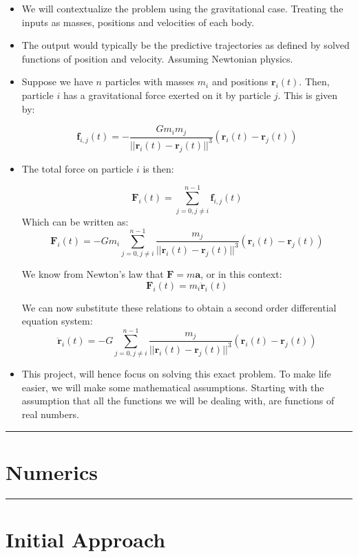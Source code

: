 \documentclass[11pt]{article}
\newcommand{\psection}[1]{{
    \begin{center}
        \noindent \rule{17cm}{0.4pt}
        \section*{\LARGE #1}
        \noindent \rule{17cm}{0.4pt}
    \end{center}
}}
\newcommand{\psubsection}[1]{{\section*{\LARGE #1}}}
\begin{document}
    \begin{itemize}
        \item We will contextualize the problem using the gravitational case. Treating the inputs as masses, positions and velocities of each body. \\

        \item The output would typically be the predictive trajectories as defined by solved functions of position and velocity. Assuming Newtonian physics. \\

        \item Suppose we have $n$ particles with masses $m_i$ and positions $\mathbf{r}_i(t)$. Then, particle $i$ has a gravitational force exerted on it by particle $j$. This is given by:

        \[ \mathbf{f}_{i,j}(t) = -\frac{Gm_i m_j}{|| \mathbf{r}_i(t) - \mathbf{r}_j(t) ||^3}(\mathbf{r}_i(t) - \mathbf{r}_j(t)) \]

        \item The total force on particle $i$ is then:

        \[ \mathbf{F}_i(t) = \sum_{j=0, j\ne i}^{n-1} \mathbf{f}_{i,j}(t) \]
        \noindent
        Which can be written as:
        \[ \mathbf{F}_i(t) = -Gm_i \sum_{j=0, j\ne i}^{n-1} \frac{ m_j}{|| \mathbf{r}_i(t) - \mathbf{r}_j(t) ||^3}(\mathbf{r}_i(t) - \mathbf{r}_j(t)) \]

        We know from Newton's law that $\mathbf{F} = m\mathbf{a}$, or in this context:
        \[ \mathbf{F}_i(t) = m_i\mathbf{\ddot{r}}_i(t) \]

        We can now substitute these relations to obtain a second order differential equation system:
        \[ \mathbf{\ddot{r}}_i(t) = -G \sum_{j=0, j\ne i}^{n-1} \frac{ m_j}{|| \mathbf{r}_i(t) - \mathbf{r}_j(t) ||^3}(\mathbf{r}_i(t) - \mathbf{r}_j(t)) \]
        \item This project, will hence focus on solving this exact problem.
        To make life easier, we will make some mathematical assumptions. Starting with the assumption that all the functions we will be dealing with, are functions of real numbers.
    \end{itemize}
    
    \newpage
    
    \psection{Numerics}
    
    \psubsection{Initial Approach}
    
\end{document}
